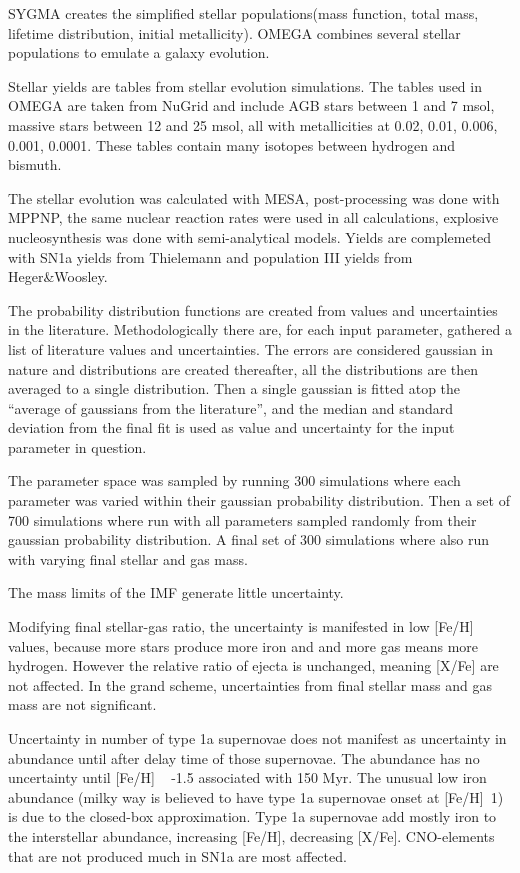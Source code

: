 SYGMA creates the simplified stellar populations(mass function, total mass, lifetime distribution, initial metallicity).
OMEGA combines several stellar populations to emulate a galaxy evolution.

Stellar yields are tables from stellar evolution simulations.
The tables used in OMEGA are taken from NuGrid and include AGB stars between 1 and 7 msol, massive stars between 12 and 25 msol, all with metallicities at 0.02, 0.01, 0.006, 0.001, 0.0001. These tables contain many isotopes between hydrogen and bismuth.

The stellar evolution was calculated with MESA, post-processing was done with MPPNP, the same nuclear reaction rates were used in all calculations, explosive nucleosynthesis was done with semi-analytical models. Yields are complemeted with SN1a yields from Thielemann and population III yields from Heger\&Woosley.

The probability distribution functions are created from values and uncertainties in the literature.
Methodologically there are, for each input parameter, gathered a list of literature values and uncertainties.
The errors are considered gaussian in nature and distributions are created thereafter,
all the distributions are then averaged to a single distribution.
Then a single gaussian is fitted atop the ``average of gaussians from the literature'',
and the median and standard deviation from
the final fit is used as value and uncertainty for the input parameter in question.

The parameter space was sampled by running 300 simulations where each parameter was varied within their gaussian probability distribution.
Then a set of 700 simulations where run with all parameters sampled randomly from their gaussian probability distribution.
A final set of 300 simulations where also run with varying final stellar and gas mass.

The mass limits of the IMF generate little uncertainty.

Modifying final stellar-gas ratio, the uncertainty is manifested in low [Fe/H] values, because more stars produce more iron and and more gas means more hydrogen. However the relative ratio of ejecta is unchanged, meaning [X/Fe] are not affected.
In the grand scheme, uncertainties from final stellar mass and gas mass are not significant.

Uncertainty in number of type 1a supernovae does not manifest as uncertainty in abundance until after delay time of those supernovae.
The abundance has no uncertainty until [Fe/H] ~ -1.5 associated with 150 Myr.
The unusual low iron abundance (milky way is believed to have type 1a supernovae onset at [Fe/H]~1) is due to the closed-box
approximation.
Type 1a supernovae add mostly iron to the interstellar abundance, increasing [Fe/H], decreasing [X/Fe].
CNO-elements that are not produced much in SN1a are most affected.

